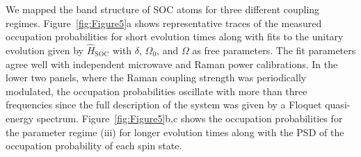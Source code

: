 %
We mapped the band structure of SOC atoms for three different coupling regimes. Figure~\ref{fig:Figure5}a shows representative traces of the measured occupation probabilities for short evolution times along with fits to the unitary evolution given by $\hat{H}_{\mathrm{SOC}}$ with $\delta$, $\Omega_0$, and $\Omega$ as free parameters. The fit parameters agree well with independent microwave and Raman power calibrations. In the lower two panels, where the Raman coupling strength was periodically modulated, the occupation probabilities oscillate with more than three frequencies since the full description of the system was given by a Floquet quasi-energy spectrum. Figure~\ref{fig:Figure5}b,c shows the occupation probabilities for the parameter regime (iii) for longer evolution times along with the PSD of the occupation probability of each spin state. 



